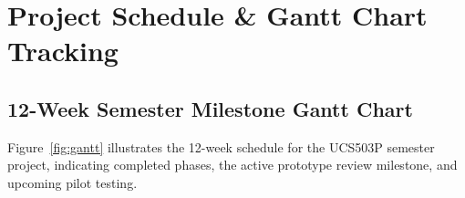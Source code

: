 \documentclass[11pt,a4paper]{article}
\begin{document}
\section{Project Schedule \& Gantt Chart Tracking}

\subsection{12-Week Semester Milestone Gantt Chart}
Figure~\ref{fig:gantt} illustrates the 12-week schedule for the UCS503P semester project, indicating completed phases, the active prototype review milestone, and upcoming pilot testing.
\end{document}
